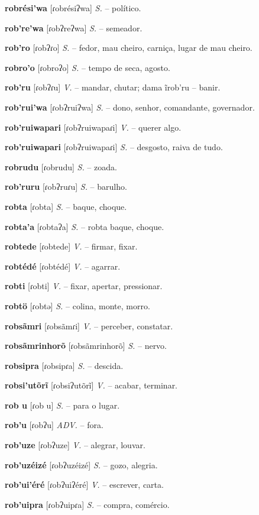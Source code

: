 \textbf{robrési'wa} [ɾobrésiʔwa] \textit{S.} -- político.

\textbf{rob're'wa} [ɾobʔreʔwa] \textit{S.} -- semeador.

\textbf{rob'ro} [ɾobʔɾo] \textit{S.} -- fedor, mau cheiro, carniça, lugar de mau cheiro.

\textbf{robro'o} [ɾobroʔo] \textit{S.} -- tempo de seca, agosto.

\textbf{rob'ru} [ɾobʔɾu] \textit{V.} -- mandar, chutar; dama ĩrob'ru -- banir.

\textbf{rob'rui'wa} [ɾobʔruiʔwa] \textit{S.} -- dono, senhor, comandante, governador.

\textbf{rob'ruiwapari} [ɾobʔruiwapaɾi] \textit{V.} -- querer algo.

\textbf{rob'ruiwapari} [ɾobʔruiwapaɾi] \textit{S.} -- desgosto, raiva de tudo.

\textbf{robrudu} [ɾobrudu] \textit{S.} -- zoada.

\textbf{rob'ruru} [ɾobʔruɾu] \textit{S.} -- barulho.

\textbf{robta} [ɾobta] \textit{S.} -- baque, choque.

\textbf{robta'a} [ɾobtaʔa] \textit{S.} -- robta baque, choque.

\textbf{robtede} [ɾobtede] \textit{V.} -- firmar, fixar.

\textbf{robtédé} [ɾobtédé] \textit{V.} -- agarrar.

\textbf{robti} [ɾobti] \textit{V.} -- fixar, apertar, pressionar.

\textbf{robtö} [ɾobtə] \textit{S.} -- colina, monte, morro.

\textbf{robsãmri} [ɾobsãmɾi] \textit{V.} -- perceber, constatar.

\textbf{robsãmrinhorõ} [ɾobsãmrinhorõ] \textit{S.} -- nervo.

\textbf{robsipra} [ɾobsipɾa] \textit{S.} -- descida.

\textbf{robsi'utõrĩ} [ɾobsiʔutõrĩ] \textit{V.} -- acabar, terminar.

\textbf{rob u} [ɾob u] \textit{S.} -- para o lugar.

\textbf{rob'u} [ɾobʔu] \textit{ADV.} -- fora.

\textbf{rob'uze} [ɾobʔuze] \textit{V.} -- alegrar, louvar.

\textbf{rob'uzéizé} [ɾobʔuzéizé] \textit{S.} -- gozo, alegria.

\textbf{rob'ui'éré} [ɾobʔuiʔéré] \textit{V.} -- escrever, carta.

\textbf{rob'uipra} [ɾobʔuipɾa] \textit{S.} -- compra, comércio.


